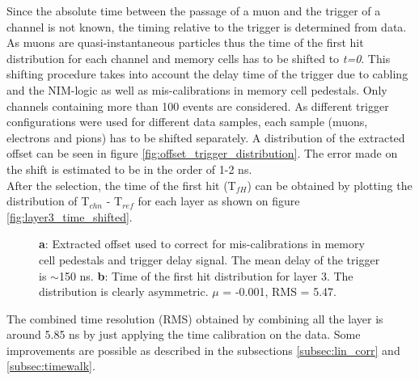 \documentclass[twoside,a4paper,11pt]{article}
\begin{document}
Since the absolute time between the passage of a muon and the trigger of a channel is not known, the timing relative to the trigger is determined from data. As muons are quasi-instantaneous particles thus the time of the first hit distribution for each channel and memory cells has to be shifted to \textit{t=0}. This shifting procedure takes into account the delay time of the trigger due to cabling and the NIM-logic as well as mis-calibrations in memory cell pedestals. Only channels containing more than 100 events are considered. As different trigger configurations were used for different data samples, each sample (muons, electrons and pions) has to be shifted separately. A distribution of the extracted offset can be seen in figure \ref{fig:offset_trigger_distribution}. The error made on the shift is estimated to be in the order of 1-2 ns.\\
After the selection, the time of the first hit (T$_{fH}$) can be obtained by plotting the distribution of T$_{chn}$ - T$_{ref}$ for each layer as shown on figure \ref{fig:layer3_time_shifted}.
\begin{figure}[htbp]
	\hfill
	\caption[]{\textbf{a}: Extracted offset used to correct for mis-calibrations in memory cell pedestals and trigger delay signal. The mean delay of the trigger is $\sim$150 ns. \textbf{b}: Time of the first hit distribution for layer 3. The distribution is clearly asymmetric. $\mu$ = -0.001, RMS = 5.47.}
\end{figure}
The combined time resolution (RMS) obtained by combining all the layer is around 5.85 ns by just applying the time calibration on the data. Some improvements are possible as described in the subsections \ref{subsec:lin_corr} and \ref{subsec:timewalk}.
\end{document}
